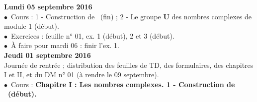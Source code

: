 \documentclass[12pt,a4paper]{article}
\begin{document}
\noindent\textbf{\bf Lundi 05 septembre 2016 }\\
$\bullet$\ Cours : 1 - Construction de \C\ (fin) ; 2 - Le groupe \textbf{U} des nombres complexes de 
module 1 (début).\\
$\bullet$\ Exercices : feuille n° 01, ex. 1 (début), 2 et 3 (début).\\
$\bullet$\ À faire pour mardi 06 : finir l'ex. 1.\vspace{.4cm}\\

\noindent\textbf{\bf Jeudi 01 septembre 2016 }\\
Journée de rentrée ; distribution des feuilles de TD, des formulaires, des
chapitres I et II, et du DM n° 01 (à rendre le 09 septembre).\\
$\bullet$\ Cours : \bf Chapitre I \rm : Les nombres complexes. 1 - Construction
de \C\ (début).\vspace{.4cm}\\


\label{end}
\end{document}
